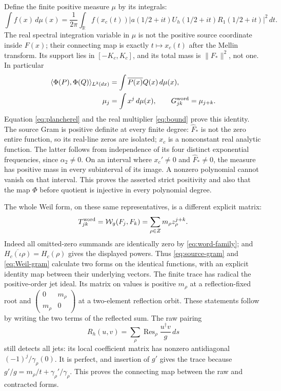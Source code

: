 \documentclass[11pt]{article}
\DeclareMathOperator{\Res}{Res}
\newcommand{\R}{\mathbb R}
\newcommand{\dd}{\,d}
\begin{document}
Define the finite positive measure $\mu$ by its integrals:
\begin{equation}
 \int f(x)\dd\mu(x)=\frac1{2\pi}\int_\R
  f(x_c(t))|a(1/2+it)U_h(1/2+it)R_1(1/2+it)|^2\dd t.
 \label{eq:measure}
\end{equation}
The real spectral integration variable in $\mu$ is not the positive
source coordinate inside $F(x)$; their connecting map is exactly
$t\mapsto x_c(t)$ after the Mellin transform.
Its support lies in $[-K_c,K_c]$, and its total mass is
$\|F_*\|^2$, not one. In particular
\begin{align}
 \langle\Phi(P),\Phi(Q)\rangle_{L^2(dx)}
     &=\int\overline{P(x)}Q(x)\dd\mu(x),\nonumber\\
 \mu_j&=\int x^j\dd\mu(x),\qquad
 G^{\rm word}_{jk}=\mu_{j+k}.\label{eq:source-gram}
\end{align}
Equation \eqref{eq:plancherel} and the real multiplier
\eqref{eq:bound} prove this identity. The source Gram is positive
definite at every finite degree: $\widehat F_*$ is not the zero entire
function, so its real-line zeros are isolated; $x_c$ is a nonconstant
real analytic function. The latter follows from independence of its
four distinct exponential frequencies, since $\alpha_2\ne0$.
On an interval where $x_c'\ne0$ and $\widehat F_*\ne0$, the measure
has positive mass in every subinterval of its image. A nonzero
polynomial cannot vanish on that interval. This proves the asserted
strict positivity and also that the map $\Phi$ before quotient is
injective in every polynomial degree.

The whole Weil form, on these same representatives, is a different
explicit matrix:
\begin{equation}
 T^{\rm word}_{jk}=\mathcal W_g(F_j,F_k)
       =\sum_{\rho\in Z}m_\rho z_\rho^{j+k}.
 \label{eq:Weil-gram}
\end{equation}
Indeed all omitted-zero summands are identically zero by
\eqref{eq:word-family}; and
$\overline{H_c(\iota\rho)}=H_c(\rho)$ gives the displayed powers.
Thus \eqref{eq:source-gram} and \eqref{eq:Weil-gram} calculate two
forms on the identical functions, with an explicit identity map
between their underlying vectors. The finite trace has radical the
positive-order jet ideal. Its matrix on values is positive $m_\rho$
at a reflection-fixed root and
$\left(\begin{smallmatrix}0&m_\rho\\m_\rho&0\end{smallmatrix}\right)$
at a two-element reflection orbit. These statements follow by writing
the two terms of the reflected sum. The raw pairing
\[
 R_h(u,v)=\sum_\rho\Res_\rho\frac{u^\dagger v}{g}\dd s
\]
still detects all jets: its local coefficient matrix has nonzero
antidiagonal $(-1)^j/\gamma_\rho(0)$. It is perfect, and insertion
of $g'$ gives the trace because $g'/g=m_\rho/t+\gamma_\rho'/\gamma_\rho$.
This proves the connecting map between the raw and contracted forms.
\end{document}
